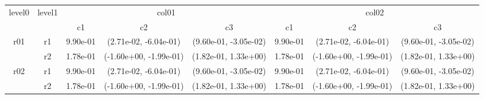 \begin{tabular}{cccccccc}
\toprule
\multirow{2}{*}{level0} & \multirow{2}{*}{level1}&\multicolumn{3}{c}{col01}&\multicolumn{3}{c}{col02}\tabularnewline
\cmidrule(lr){3-5}
\cmidrule(lr){6-8}
&&c1&c2&c3&c1&c2&c3\tabularnewline
\midrule
\midrule
\multirow{2}{*}{r01}&r1&9.90e-01& (2.71e-02, -6.04e-01)& (9.60e-01, -3.05e-02)&9.90e-01& (2.71e-02, -6.04e-01)& (9.60e-01, -3.05e-02)\tabularnewline
&r2&1.78e-01& (-1.60e+00, -1.99e-01)& (1.82e-01, 1.33e+00)&1.78e-01& (-1.60e+00, -1.99e-01)& (1.82e-01, 1.33e+00)\tabularnewline
\midrule
\multirow{2}{*}{r02}&r1&9.90e-01& (2.71e-02, -6.04e-01)& (9.60e-01, -3.05e-02)&9.90e-01& (2.71e-02, -6.04e-01)& (9.60e-01, -3.05e-02)\tabularnewline
&r2&1.78e-01& (-1.60e+00, -1.99e-01)& (1.82e-01, 1.33e+00)&1.78e-01& (-1.60e+00, -1.99e-01)& (1.82e-01, 1.33e+00)\tabularnewline
\bottomrule
\end{tabular}
